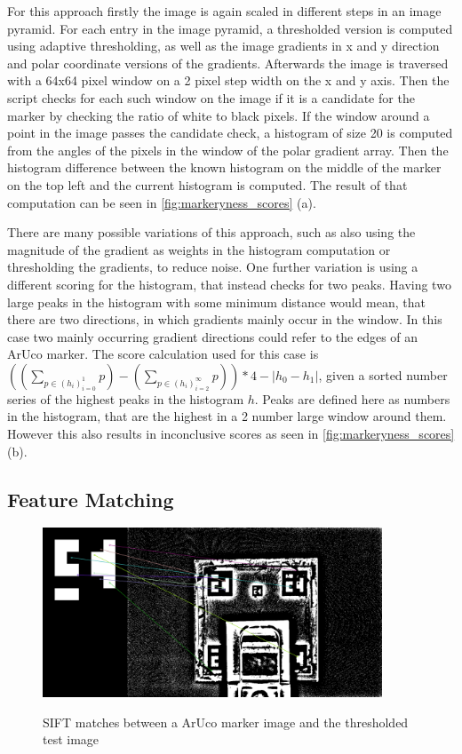 \documentclass[10pt]{book}
\begin{document}
For this approach firstly the image is again scaled in different steps in an image pyramid. For each entry in the image pyramid, a thresholded version is computed using adaptive thresholding, as well as the image gradients in x and y direction and polar coordinate versions of the gradients. Afterwards the image is traversed with a 64x64 pixel window on a 2 pixel step width on the x and y axis. Then the script checks for each such window on the image if it is a candidate for the marker by checking the ratio of white to black pixels. If the window around a point in the image passes the candidate check, a histogram of size 20 is computed from the angles of the pixels in the window of the polar gradient array. Then the histogram difference between the known histogram on the middle of the marker on the top left and the current histogram is computed. The result of that computation can be seen in \autoref{fig:markeryness_scores} (a). 

There are many possible variations of this approach, such as also using the magnitude of the gradient as weights in the histogram computation or thresholding the gradients, to reduce noise. One further variation is using a different scoring for the histogram, that instead checks for two peaks. Having two large peaks in the histogram with some minimum distance would mean, that there are two directions, in which gradients mainly occur in the window. In this case two mainly occurring gradient directions could refer to the edges of an \ac{ArUco} marker. The score calculation used for this case is $((\sum_{p \in (h_i)^1_{i=0}}p) - (\sum_{p \in (h_i)^\infty_{i=2}}p)) * 4 - |h_0 - h_1|$, given a sorted number series of the highest peaks in the histogram $h$. Peaks are defined here as numbers in the histogram, that are the highest in a 2 number large window around them. However this also results in inconclusive scores as seen in \autoref{fig:markeryness_scores} (b).

\subsection{Feature Matching}

\begin{figure}
  \caption{\ac{SIFT} matches between a \ac{ArUco} marker image and the thresholded test image}
  \includegraphics[width=0.9\textwidth]{image/classic_sift_matches}
  \label{fig:classic_sift_matches}
\end{figure}
\end{document}
